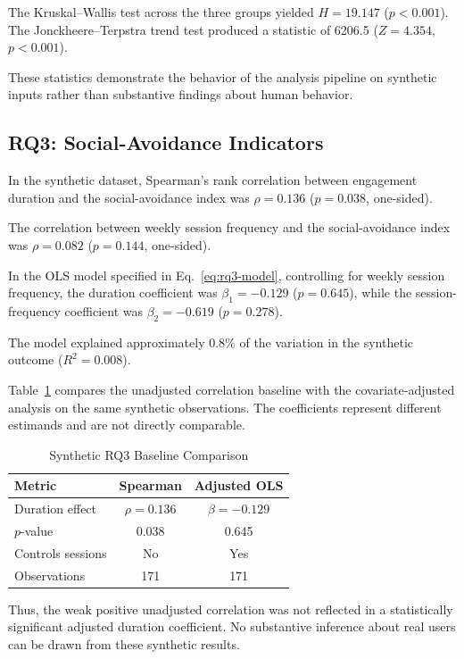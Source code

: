 The Kruskal--Wallis test across the three groups
yielded $H=19.147$ ($p<0.001$).
The Jonckheere--Terpstra trend test produced
a statistic of 6206.5 ($Z=4.354$, $p<0.001$).

These statistics demonstrate the behavior of the
analysis pipeline on synthetic inputs rather than
substantive findings about human behavior.

\subsection{RQ3: Social-Avoidance Indicators}
\label{subsec:rq3-results}

In the synthetic dataset, Spearman's rank correlation
between engagement duration and the social-avoidance
index was $\rho=0.136$ ($p=0.038$, one-sided).

The correlation between weekly session frequency and
the social-avoidance index was $\rho=0.082$
($p=0.144$, one-sided).

In the OLS model specified in
Eq.~\eqref{eq:rq3-model}, controlling for weekly
session frequency, the duration coefficient was
$\beta_1=-0.129$ ($p=0.645$), while the
session-frequency coefficient was
$\beta_2=-0.619$ ($p=0.278$).

The model explained approximately 0.8\% of the
variation in the synthetic outcome
($R^2=0.008$).

Table~\ref{tab:baseline-comparison} compares
the unadjusted correlation baseline with the
covariate-adjusted analysis on the same
synthetic observations. The coefficients
represent different estimands and are not
directly comparable.

\begin{table}[t]
\centering
\caption{Synthetic RQ3 Baseline Comparison}
\label{tab:baseline-comparison}
\begin{tabular}{lcc}
\toprule
Metric & Spearman & Adjusted OLS \\
\midrule
Duration effect & $\rho=0.136$ & $\beta=-0.129$ \\
$p$-value & 0.038 & 0.645 \\
Controls sessions & No & Yes \\
Observations & 171 & 171 \\
\bottomrule
\end{tabular}
\end{table}


Thus, the weak positive unadjusted correlation
was not reflected in a statistically significant
adjusted duration coefficient.
No substantive inference about real users
can be drawn from these synthetic results.
